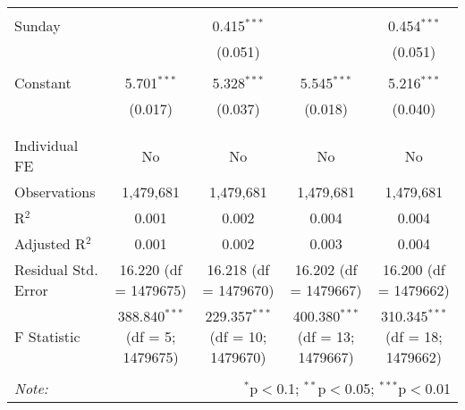 \documentclass[
]{article}
\begin{document}
\begin{table}[!htbp]
{\begin{tabular}{@{\extracolsep{5pt}}lcccc}
  & & & & \\ 
 Sunday &  & 0.415$^{***}$ &  & 0.454$^{***}$ \\ 
  &  & (0.051) &  & (0.051) \\ 
  & & & & \\ 
 Constant & 5.701$^{***}$ & 5.328$^{***}$ & 5.545$^{***}$ & 5.216$^{***}$ \\ 
  & (0.017) & (0.037) & (0.018) & (0.040) \\ 
  & & & & \\ 
\hline \\[-1.8ex] 
Individual FE & No & No & No & No \\ 
Observations & 1,479,681 & 1,479,681 & 1,479,681 & 1,479,681 \\ 
R$^{2}$ & 0.001 & 0.002 & 0.004 & 0.004 \\ 
Adjusted R$^{2}$ & 0.001 & 0.002 & 0.003 & 0.004 \\ 
Residual Std. Error & 16.220 (df = 1479675) & 16.218 (df = 1479670) & 16.202 (df = 1479667) & 16.200 (df = 1479662) \\ 
F Statistic & 388.840$^{***}$ (df = 5; 1479675) & 229.357$^{***}$ (df = 10; 1479670) & 400.380$^{***}$ (df = 13; 1479667) & 310.345$^{***}$ (df = 18; 1479662) \\ 
\hline 
\hline \\[-1.8ex] 
\textit{Note:}  & \multicolumn{4}{r}{$^{*}$p$<$0.1; $^{**}$p$<$0.05; $^{***}$p$<$0.01} \\ 
\end{tabular}
} 
\end{table} 
\newpage
\end{document}
